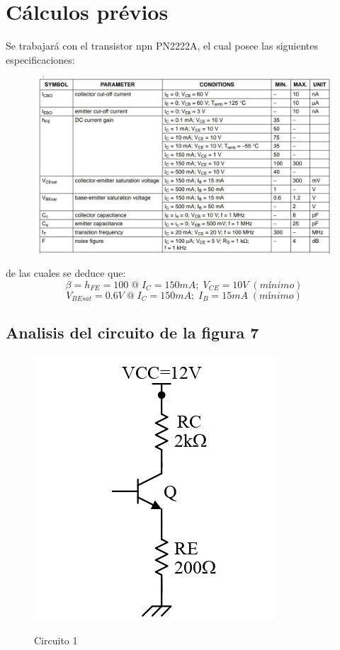 \documentclass[10pt, a4paper]{article}
\begin{document}
    \newpage

    \section{Cálculos prévios}

    Se trabajará con el transistor npn PN2222A, el cual posee las siguientes especificaciones:

    
    \begin{figure}[h!]
        \centering
        \includegraphics[height=7cm\textwidth]{especificaciones.jpg}
    \end{figure}
    

    de las cuales se deduce que:
    $$\beta = h_{FE} = 100 \; @ \; I_C = 150mA; \; V_{CE} = 10V \; (mínimo)$$
    $$V_{BEsat} = 0.6V \; @ \; I_C = 150mA; \; I_B = 15mA \; (mínimo)$$

    \subsection{Analisis del circuito de la figura 7}

    \begin{figure}[h!]
        \centering
        \includegraphics[height=5cm\textwidth]{circuito1.jpg} \par
        Circuito 1
    \end{figure}
\end{document}
